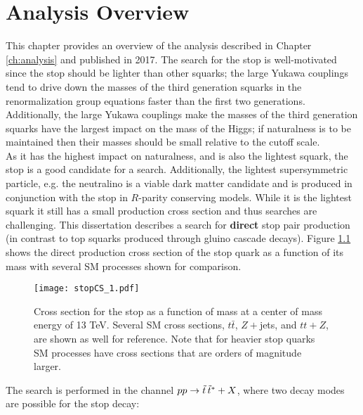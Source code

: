\chapter{Analysis Overview}
\label{ch:analysisOverview}


This chapter provides an overview of the analysis described in Chapter \ref{ch:analysis} and published in 2017\cite{stop0L13tev}.  The search for the stop is well-motivated since the stop should be lighter than other squarks; the large Yukawa couplings tend to drive down the masses of the third generation squarks in the renormalization group equations faster than the first two generations\cite{susyprimer}.  Additionally, the large Yukawa couplings make the masses of the third generation squarks have the largest impact on the mass of the Higgs; if naturalness is to be maintained then their masses should be small relative to the cutoff scale.  \\

As it has the highest impact on naturalness, and is also the lightest squark, the stop is a good candidate for a search.  Additionally, the lightest supersymmetric particle, e.g. the neutralino is a viable dark matter candidate and is produced in conjunction with the stop in $R$-parity conserving models.  While it is the lightest squark it still has a small production cross section and thus searches are challenging.  This dissertation describes a search for {\bf direct} stop pair production (in contrast to top squarks produced through gluino cascade decays).  Figure \ref{fig:stopCS} shows the direct production cross section of the stop quark as a function of its mass with several SM processes shown for comparison.  \\%
\clearpage

\begin{figure}[tbh]
	\centering
	\texttt{[image: stopCS\_1.pdf]}
	\caption[Cross section for the stop and selected backgrounds.]{\label{fig:stopCS}{Cross section for the stop as a function of mass at a center of mass energy of 13 TeV.  Several SM cross sections, $t\bar{t}$, $Z+$jets\cite{ttZcs}, and $tt+Z$\cite{ttZcs}, are shown as well for reference.  Note that for heavier stop quarks SM processes have cross sections that are orders of magnitude larger.}}
\end{figure}

The search is performed in the channel
$pp \rightarrow \tilde{t}\, {\tilde{t}}^{\ast} + X$, where two decay modes are
possible for the stop decay:

